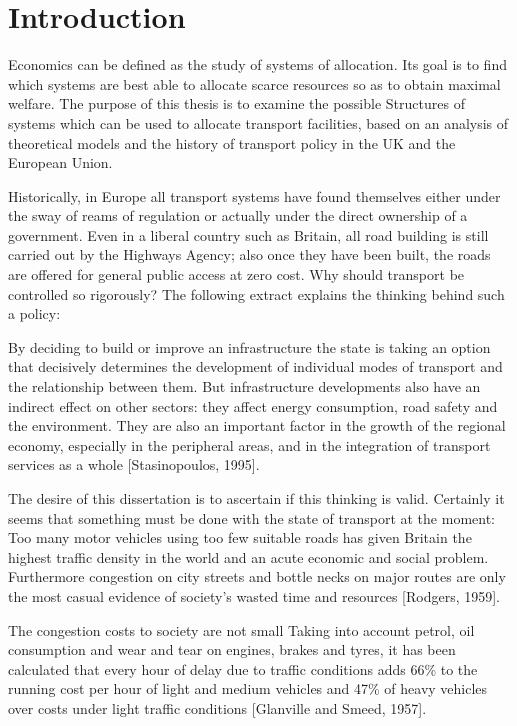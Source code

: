 \chapter{Introduction}

Economics can be defined as the study of systems of allocation. Its goal is to find which systems are best able to allocate scarce resources so as to obtain maximal welfare. The purpose of this thesis is to examine the possible Structures of systems which can be used to allocate transport facilities, based on an analysis of theoretical models and the history of transport policy in the UK and the European Union.

Historically, in Europe all transport systems have found themselves either under the sway of reams of regulation or actually under the direct ownership of a government. Even in a liberal country such as Britain, all road building is still carried out by the Highways Agency; also once they have been built, the roads are offered for general public access at zero cost. Why should transport be controlled so rigorously? The following extract explains the thinking behind such a policy:

\begin{displayquote}
By deciding to build or improve an infrastructure the state is taking an option that decisively determines the development of individual modes of transport and the relationship between them. But infrastructure developments also have an indirect effect on other sectors: they affect energy consumption, road safety and the environment. They are also an important factor in the growth of the regional economy, especially in the peripheral areas, and in the integration of transport services as a whole [Stasinopoulos, 1995].
\end{displayquote}

The desire of this dissertation is to ascertain if this thinking is valid. Certainly it seems that something must be done with the state of transport at the moment: Too many motor vehicles using too few suitable roads has given Britain the highest traffic density in the world and an acute economic and social problem. Furthermore congestion on city streets and bottle necks on major routes are only the most casual evidence of society's wasted time and resources [Rodgers, 1959].
 
The congestion costs to society are not small Taking into account petrol, oil consumption and wear and tear on engines, brakes and tyres, it has been calculated that every hour of delay due to traffic conditions adds 66\% to the running cost per hour of light and medium vehicles and 47\% of heavy vehicles over costs under light traffic conditions [Glanville and Smeed, 1957].

